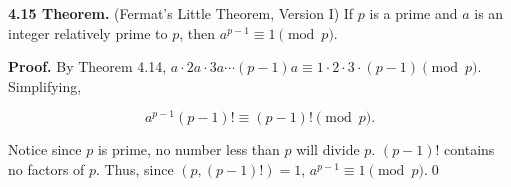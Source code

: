 \documentclass[12pt]{article}
\begin{document}
\noindent\textbf{4.15 Theorem.} (Fermat's Little Theorem, Version I) If $p$ is a prime and $a$ is an integer relatively prime to $p$, then $a^{p-1}\equiv 1\pmod p$.

\bigskip

\noindent\textbf{Proof.} By Theorem 4.14, $a\cdot 2a\cdot 3a\cdots (p-1)a\equiv 1\cdot 2\cdot 3\cdot (p-1)\pmod p$. Simplifying,

\begin{equation*}
a^{p-1}(p-1)!\equiv (p-1)!\pmod p.
\end{equation*}

\noindent Notice since $p$ is prime, no number less than $p$ will divide $p$. $(p-1)!$ contains no factors of $p$. Thus, since $(p,(p-1)!)=1$, $a^{p-1}\equiv 1\pmod p$.\qed
\end{document}
